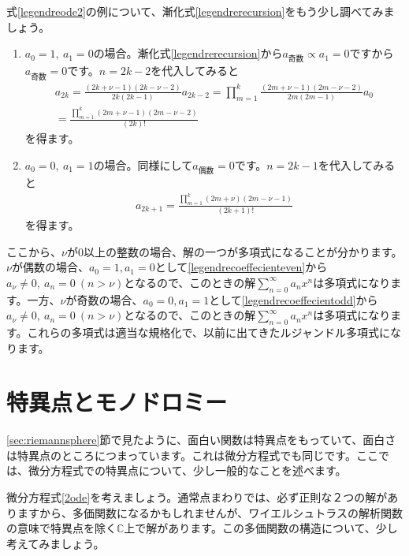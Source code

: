 \documentclass[report,paper=a4, fontsize=12pt, line_length=16cm, number_of_lines=33,dvipdfmx]{jlreq}
\numberwithin{equation}{section}
\newcommand{\Cb}{\mathbb{C}}
\begin{document}
式\eqref{legendreode2}の例について、漸化式\eqref{legendrerecursion}をもう少し調べてみましょう。
\begin{enumerate}
  \item $a_0=1,\ a_1=0$の場合。漸化式\eqref{legendrerecursion}から$a_{\text{奇数}}\propto a_1=0$ですから$a_{\text{奇数}}=0$です。$n=2k-2$を代入してみると
  \begin{align}
    a_{2k}=\frac{(2k+\nu-1)(2k-\nu-2)}{2k(2k-1)}a_{2k-2}
    =\prod_{m=1}^{k}\frac{(2m+\nu-1)(2m-\nu-2)}{2m(2m-1)} a_0 \nonumber\\
    =\frac{\prod_{m=1}^{k}(2m+\nu-1)(2m-\nu-2)}{(2k)!}\label{legendrecoeffecienteven}
  \end{align}
  を得ます。
  \item $a_0=0,\ a_1=1$の場合。同様にして$a_{\text{偶数}}=0$です。$n=2k-1$を代入してみると
  \begin{align}
    a_{2k+1}
    =\frac{\prod_{m=1}^{k}(2m+\nu)(2m-\nu-1)}{(2k+1)!}\label{legendrecoeffecientodd}
  \end{align}
  を得ます。
\end{enumerate}
ここから、$\nu$が$0$以上の整数の場合、解の一つが多項式になることが分かります。$\nu$が偶数の場合、$a_0=1,a_1=0$として\eqref{legendrecoeffecienteven}から$a_{\nu}\ne 0,\ a_{n}=0\ (n>\nu)$となるので、このときの解$\sum_{n=0}^{\infty}a_nx^n$は多項式になります。一方、$\nu$が奇数の場合、$a_0=0,a_1=1$として\eqref{legendrecoeffecientodd}から$a_{\nu}\ne 0,\ a_{n}=0\ (n>\nu)$となるので、このときの解$\sum_{n=0}^{\infty}a_nx^n$は多項式になります。これらの多項式は適当な規格化で、以前に出てきたルジャンドル多項式になります。

\section{特異点とモノドロミー}
\ref{sec:riemannsphere}節で見たように、面白い関数は特異点をもっていて、面白さは特異点のところにつまっています。これは微分方程式でも同じです。ここでは、微分方程式での特異点について、少し一般的なことを述べます。

微分方程式\eqref{2ode}を考えましょう。通常点まわりでは、必ず正則な２つの解がありますから、多価関数になるかもしれませんが、ワイエルシュトラスの解析関数の意味で特異点を除く$\Cb$上で解があります。この多価関数の構造について、少し考えてみましょう。
\end{document}
